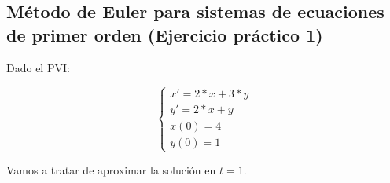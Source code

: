 \documentclass[12pt]{article}       %
\begin{document}
\subsection{Método de Euler para sistemas de ecuaciones de primer orden (Ejercicio práctico 1) }
Dado el PVI:

$$
\begin{cases}
x' = 2*x + 3 * y\\
y' = 2*x + y \\
x(0) = 4\\
y(0)=1
\end{cases}
$$

Vamos a tratar de aproximar la solución en $t=1$.%







\end{document}
